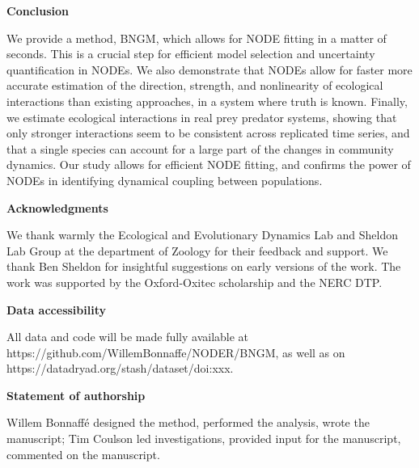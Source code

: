 \documentclass[11pt, oneside]{article}
\begin{document}
\textbf{Conclusion}

We provide a method, BNGM, which allows for NODE fitting in a matter of seconds.
This is a crucial step for efficient model selection and uncertainty quantification in NODEs.
We also demonstrate that NODEs allow for faster more accurate estimation of the direction, strength, and nonlinearity of ecological interactions than existing approaches, in a system where truth is known.
Finally, we estimate ecological interactions in real prey predator systems, showing that only stronger interactions seem to be consistent across replicated time series, and that a single species can account for a large part of the changes in community dynamics.
Our study allows for efficient NODE fitting, and confirms the power of NODEs in identifying dynamical coupling between populations. 

\textbf{Acknowledgments}

We thank warmly the Ecological and Evolutionary Dynamics Lab and Sheldon Lab Group at the department of Zoology for their feedback and support.
We thank Ben Sheldon for insightful suggestions on early versions of the work.
The work was supported by the Oxford-Oxitec scholarship and the NERC DTP.

\textbf{Data accessibility}

All data and code will be made fully available at https://github.com/WillemBonnaffe/NODER/BNGM, as well as on https://datadryad.org/stash/dataset/doi:xxx.

\textbf{Statement of authorship}

Willem Bonnaff\'e designed the method, performed the analysis, wrote the manuscript; 
Tim Coulson led investigations, provided input for the manuscript, commented on the manuscript.

\printbibliography 

\newpage
{}
\end{document}
